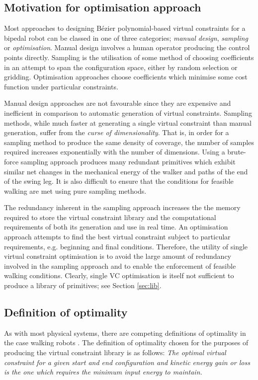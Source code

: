 \subsection{Motivation for optimisation approach}
Most approaches to designing Bézier polynomial-based virtual constraints for a bipedal robot can be classed in one of three categories; \textit{manual design}, \textit{sampling} or \textit{optimisation}. Manual design involves a human operator producing the control points directly. Sampling is the utilisation of some method of choosing coefficients in an attempt to span the configuration space, either by random selection or gridding. Optimisation approaches choose coefficients which minimise some cost function under particular constraints.

Manual design approaches are not favourable since they are expensive and inefficient in comparison to automatic generation of virtual constraints. Sampling methods, while much faster at generating a single virtual constraint than manual generation, suffer from the \textit{curse of dimensionality}. That is, in order for a sampling method to produce the same density of coverage, the number of samples required increases exponentially with the number of dimensions. Using a brute-force sampling approach produces many redundant primitives which exhibit similar net changes in the mechanical energy of the walker and paths of the end of the swing leg. It is also difficult to ensure that the conditions for feasible walking are met using pure sampling methods.

The redundancy inherent in the sampling approach increases the the memory required to store the virtual constraint library and the computational requirements of both its generation and use in real time. An optimisation approach attempts to find the best virtual constraint subject to particular requirements, e.g. beginning and final conditions. Therefore, the utility of single virtual constraint optimisation is to avoid the large amount of redundancy involved in the sampling approach and to enable the enforcement of feasible walking conditions. Clearly, single VC optimisation is itself not sufficient to produce a library of primitives; see Section \ref{sec:lib}.

\subsection{Definition of optimality}
As with most physical systems, there are competing definitions of optimality in the case walking robots \cite{sreenath2011compliant, westervelt2003hybrid, hurmuzlu2004modeling}. The definition of optimality chosen for the purposes of producing the virtual constraint library is as follows:
\emph{The optimal virtual constraint for a given start and end configuration and kinetic energy gain or loss is the one which requires the minimum input energy to maintain.}

